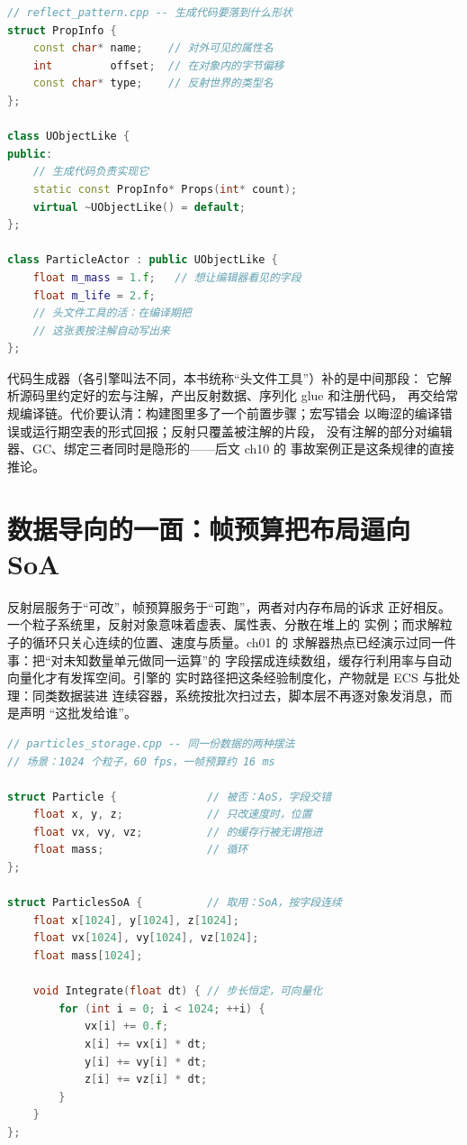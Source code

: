 \documentclass[12pt,a4paper,fontset=fandol]{ctexbook}
\begin{document}
\begin{lstlisting}[language=C++, style=cppstyle,
  caption={反射信息的最小形状：属性名、偏移、类型名组成的静态表},
  label={lst:ch09-register-pattern}]
// reflect_pattern.cpp -- 生成代码要落到什么形状
struct PropInfo {
    const char* name;    // 对外可见的属性名
    int         offset;  // 在对象内的字节偏移
    const char* type;    // 反射世界的类型名
};

class UObjectLike {
public:
    // 生成代码负责实现它
    static const PropInfo* Props(int* count);
    virtual ~UObjectLike() = default;
};

class ParticleActor : public UObjectLike {
    float m_mass = 1.f;   // 想让编辑器看见的字段
    float m_life = 2.f;
    // 头文件工具的活：在编译期把
    // 这张表按注解自动写出来
};
\end{lstlisting}

代码生成器（各引擎叫法不同，本书统称``头文件工具''）补的是中间那段：
它解析源码里约定好的宏与注解，产出反射数据、序列化 glue 和注册代码，
再交给常规编译链。代价要认清：构建图里多了一个前置步骤；宏写错会
以晦涩的编译错误或运行期空表的形式回报；反射只覆盖被注解的片段，
没有注解的部分对编辑器、GC、绑定三者同时是隐形的——后文 ch10 的
事故案例正是这条规律的直接推论。

\section{数据导向的一面：帧预算把布局逼向 SoA}
\label{sec:ch09-data-oriented}

反射层服务于``可改''，帧预算服务于``可跑''，两者对内存布局的诉求
正好相反。一个粒子系统里，反射对象意味着虚表、属性表、分散在堆上的
实例；而求解粒子的循环只关心连续的位置、速度与质量。ch01 的
求解器热点已经演示过同一件事：把``对未知数量单元做同一运算''的
字段摆成连续数组，缓存行利用率与自动向量化才有发挥空间。引擎的
实时路径把这条经验制度化，产物就是 ECS 与批处理：同类数据装进
连续容器，系统按批次扫过去，脚本层不再逐对象发消息，而是声明
``这批发给谁''。

\begin{lstlisting}[language=C++, style=cppstyle,
  caption={帧预算下的两种布局：AoS 逐对象交错，SoA 按字段连续},
  label={lst:ch09-soa-storage}]
// particles_storage.cpp -- 同一份数据的两种摆法
// 场景：1024 个粒子，60 fps，一帧预算约 16 ms

struct Particle {              // 被否：AoS，字段交错
    float x, y, z;             // 只改速度时，位置
    float vx, vy, vz;          // 的缓存行被无谓拖进
    float mass;                // 循环
};

struct ParticlesSoA {          // 取用：SoA，按字段连续
    float x[1024], y[1024], z[1024];
    float vx[1024], vy[1024], vz[1024];
    float mass[1024];

    void Integrate(float dt) { // 步长恒定，可向量化
        for (int i = 0; i < 1024; ++i) {
            vx[i] += 0.f;
            x[i] += vx[i] * dt;
            y[i] += vy[i] * dt;
            z[i] += vz[i] * dt;
        }
    }
};
\end{lstlisting}
\end{document}
